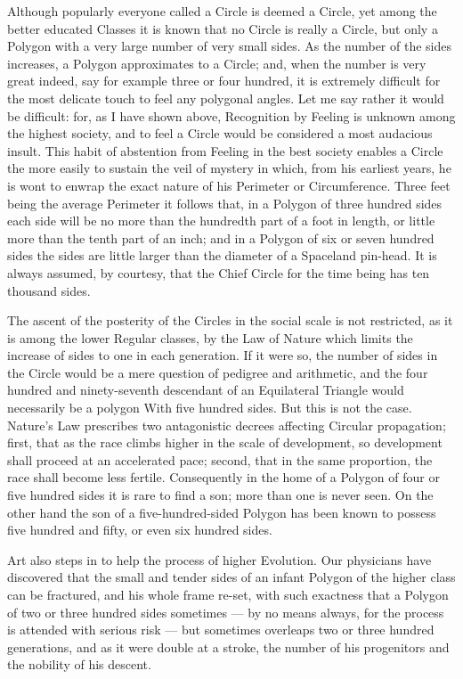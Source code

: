 \documentclass[12pt, a4paper, twoside]{memoir}
\begin{document}
Although popularly everyone called a Circle is deemed a Circle, yet among the
better educated Classes it is known that no Circle is really a Circle, but
only a Polygon with a very large number of very small sides. As the number of
the sides increases, a Polygon approximates to a Circle; and, when the number
is very great indeed, say for example three or four hundred, it is extremely
difficult for the most delicate touch to feel any polygonal angles. Let me say
rather it would be difficult: for, as I have shown above, Recognition by
Feeling is unknown among the highest society, and to feel a Circle would be
considered a most audacious insult. This habit of abstention from Feeling in
the best society enables a Circle the more easily to sustain the veil of
mystery in which, from his earliest years, he is wont to enwrap the exact
nature of his Perimeter or Circumference. Three feet being the average
Perimeter it follows that, in a Polygon of three hundred sides each side will
be no more than the hundredth part of a foot in length, or little more than
the tenth part of an inch; and in a Polygon of six or seven hundred sides the
sides are little larger than the diameter of a Spaceland pin-head. It is
always assumed, by courtesy, that the Chief Circle for the time being has ten
thousand sides.

The ascent of the posterity of the Circles in the social scale is not
restricted, as it is among the lower Regular classes, by the Law of Nature
which limits the increase of sides to one in each generation. If it were so,
the number of sides in the Circle would be a mere question of pedigree and
arithmetic, and the four hundred and ninety-seventh descendant of an
Equilateral Triangle would necessarily be a polygon With five hundred sides.
But this is not the case. Nature's Law prescribes two antagonistic decrees
affecting Circular propagation; first, that as the race climbs higher in the
scale of development, so development shall proceed at an accelerated pace;
second, that in the same proportion, the race shall become less fertile.
Consequently in the home of a Polygon of four or five hundred sides it is rare
to find a son; more than one is never seen. On the other hand the son of a
five-hundred-sided Polygon has been known to possess five hundred and fifty,
or even six hundred sides.

Art also steps in to help the process of higher Evolution. Our physicians have
discovered that the small and tender sides of an infant Polygon of the higher
class can be fractured, and his whole frame re-set, with such exactness that a
Polygon of two or three hundred sides sometimes --- by no means always, for the
process is attended with serious risk --- but sometimes overleaps two or three
hundred generations, and as it were double at a stroke, the number of his
progenitors and the nobility of his descent.
\end{document}
